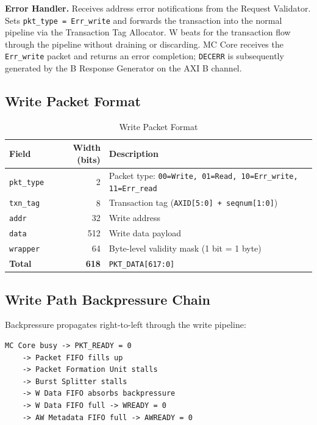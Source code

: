 \textbf{Error Handler.}
Receives address error notifications from the Request Validator. Sets \texttt{pkt\_type = Err\_write} and forwards the transaction into the normal pipeline via the Transaction Tag Allocator. W beats for the transaction flow through the pipeline without draining or discarding. MC Core receives the \texttt{Err\_write} packet and returns an error completion; \texttt{DECERR} is subsequently generated by the B Response Generator on the AXI B channel.

\subsection{Write Packet Format}

\begin{table}[h]
\centering
\begin{tabular}{lrl}
\toprule
\textbf{Field} & \textbf{Width (bits)} & \textbf{Description} \\
\midrule
\texttt{pkt\_type} & 2   & Packet type: \texttt{00=Write, 01=Read, 10=Err\_write, 11=Err\_read} \\
\texttt{txn\_tag}  & 8   & Transaction tag (\texttt{AXID[5:0] + seqnum[1:0]}) \\
\texttt{addr}      & 32  & Write address \\
\texttt{data}      & 512 & Write data payload \\
\texttt{wrapper}   & 64  & Byte-level validity mask (1 bit = 1 byte) \\
\midrule
\textbf{Total}     & \textbf{618} & \texttt{PKT\_DATA[617:0]} \\
\bottomrule
\end{tabular}
\caption{Write Packet Format}
\end{table}

\subsection{Write Path Backpressure Chain}

Backpressure propagates right-to-left through the write pipeline:

\begin{lstlisting}
MC Core busy -> PKT_READY = 0
    -> Packet FIFO fills up
    -> Packet Formation Unit stalls
    -> Burst Splitter stalls
    -> W Data FIFO absorbs backpressure
    -> W Data FIFO full -> WREADY = 0
    -> AW Metadata FIFO full -> AWREADY = 0
\end{lstlisting}

